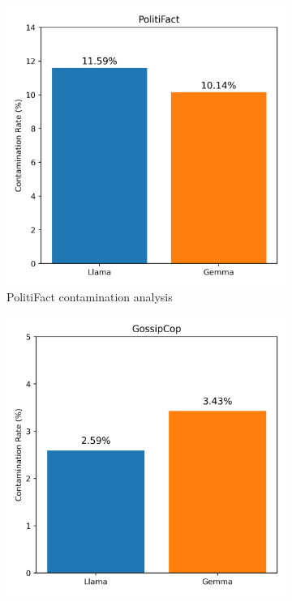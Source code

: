 \begin{figure}[htbp]
\centering
\begin{subfigure}[b]{0.48\textwidth}
    \includegraphics[width=\textwidth]{context/results/fig/politifact_contamination_rate.png}
    \caption{PolitiFact contamination analysis}
    \label{fig:politifact_contamination}
\end{subfigure}
\hfill
\begin{subfigure}[b]{0.48\textwidth}
    \includegraphics[width=\textwidth]{context/results/fig/gossipcop_contamination_rate.png}

\end{subfigure}
\end{figure}
